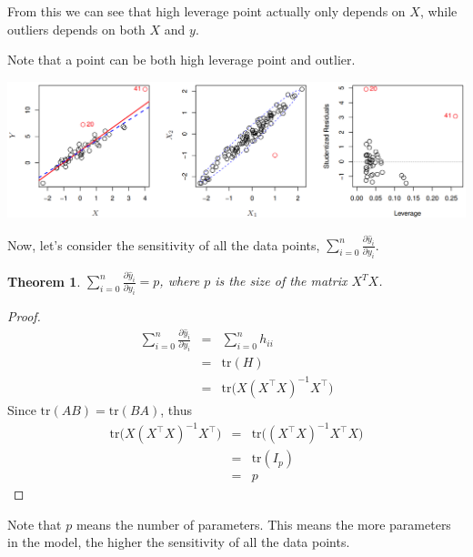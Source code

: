 \documentclass{article}
\theoremstyle{MyNonumberplain}
\theoremstyle{break}
\newtheorem*{proof}{Proof. }
\newcommand{\T}{^\intercal}
\newcommand{\inv}{^{-1}}
\newcommand{\pd}[2]{\frac{\partial {#1}}{\partial {#2}}}
\newcommand{\tr}{\text{tr}}
\theoremstyle{break}
\newtheorem{theorem}{Theorem}[section]
\theoremstyle{break}
\theoremstyle{break}
\begin{document}
From this we can see that high leverage point actually only depends on $X$, while outliers depends on both $X$ and $y$.

Note that a point can be both high leverage point and outlier.

\begin{center}
    \includegraphics*[scale=0.24]{Images/img12.png}
\end{center}

Now, let's consider the sensitivity of all the data points, $\sum_{i=0}^n \pd{\hat y_i}{y_i}$. 

\begin{thmbox}
    \begin{theorem}
        \vphantom{.}

        $\sum_{i=0}^n \pd{\hat y_i}{y_i}=p$, where $p$ is the size of the matrix $X^T X$.
    \end{theorem}
    \begin{prfbox}
        \begin{proof}
            \begin{eqnarray*}
                \sum_{i=0}^n \pd{\hat y_i}{y_i} &=& \sum_{i=0}^n h_{ii}\\
                                                &=& \tr(H)\\
                                                &=& \tr\biggl(X(X\T X)\inv X\T\biggr)
            \end{eqnarray*}
            Since $\tr(AB)=\tr(BA)$, thus
            \begin{eqnarray*}
                \tr\biggl(X(X\T X)\inv X\T\biggr) &=& \tr\biggl((X\T X)\inv X\T X\biggr)\\
                                                  &=& \tr(I_p)\\
                                                  &=& p
            \end{eqnarray*}
        \end{proof}
    \end{prfbox}
\end{thmbox} 

Note that $p$ means the number of parameters. This means the more parameters in the model, the
higher the sensitivity of all the data points.
\end{document}
